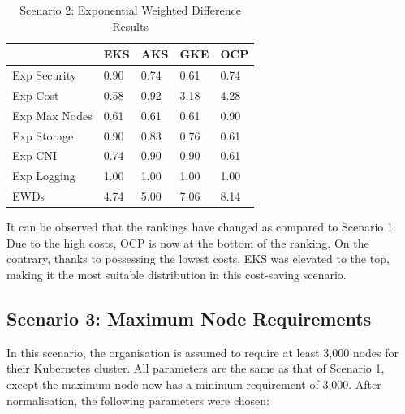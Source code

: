 \begin{table}[!ht]
    \centering
    \begin{tabular}{|p{4cm}|p{2cm}|p{2cm}|p{2cm}|p{2cm}|} %
    \hline
         & EKS& AKS& GKE& OCP\\ \hline
        Exp Security & 0.90 & 0.74 & 0.61 & 0.74 \\ \hline
        Exp Cost & 0.58 & 0.92 & 3.18 & 4.28 \\ \hline
        Exp Max Nodes & 0.61 & 0.61 & 0.61 & 0.90 \\ \hline
        Exp Storage & 0.90 & 0.83 & 0.76 & 0.61 \\ \hline
        Exp CNI & 0.74 & 0.90 & 0.90 & 0.61 \\ \hline
        Exp Logging & 1.00 & 1.00 & 1.00 & 1.00 \\ \hline

 EWDs& 4.74& 5.00& 7.06 & 8.14\\\hline
    \end{tabular}
    \caption{Scenario 2: Exponential Weighted Difference Results} 
    \label{tab:scenario-2-ewds}
\end{table}

It can be observed that the rankings have changed as compared to Scenario 1. Due to the high costs, OCP is now at the bottom of the ranking. On the contrary, thanks to possessing the lowest costs, EKS was elevated to the top, making it the most suitable distribution in this cost-saving scenario.

\subsection{Scenario 3: Maximum Node Requirements}\label{subsec:evaluation-scenario-3}

In this scenario, the organisation is assumed to require at least 3,000 nodes for their Kubernetes cluster. All parameters are the same as that of Scenario 1, except the maximum node now has a minimum requirement of 3,000. After normalisation, the following parameters were chosen:

